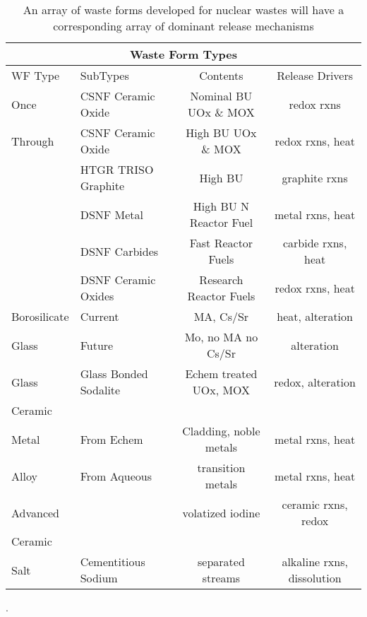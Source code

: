 %
\begin{table}[h!]
  \centering
  \footnotesize{
  \begin{tabular}{|l|l|c|c|}
    \multicolumn{4}{c}{\textbf{Waste Form Types}}\\
    \hline
    WF Type & SubTypes & Contents & Release Drivers  \\
    \hline
    \hline
    Once         & CSNF Ceramic Oxide & Nominal BU UOx \& MOX & redox rxns \\
     Through     & CSNF Ceramic Oxide & High BU UOx \& MOX & redox rxns, heat  \\
                 & HTGR TRISO Graphite & High BU & graphite rxns\\
                 & DSNF Metal  & High BU N Reactor Fuel & metal rxns,  heat\\
                 & DSNF Carbides  & Fast Reactor Fuels & carbide rxns,  heat\\
                 & DSNF Ceramic Oxides  & Research Reactor Fuels & redox rxns,  heat\\
    \hline
    Borosilicate & Current & MA, Cs/Sr & heat, alteration \\
     Glass       & Future & Mo, no MA no Cs/Sr & alteration  \\
    \hline
    Glass & Glass Bonded Sodalite & Echem treated UOx, MOX & redox, alteration\\
    Ceramic  &&&\\
    \hline
    Metal & From Echem & Cladding, noble metals & metal rxns, heat \\
    Alloy       & From Aqueous & transition metals & metal rxns, heat  \\
    \hline
    Advanced &  & volatized iodine  & ceramic rxns, redox \\
    Ceramic &&&\\
    \hline
    Salt  & Cementitious Sodium  & separated streams  & alkaline rxns, dissolution \\
    \hline
  \end{tabular}
  \caption[Waste Form Types]{An array of waste forms developed for nuclear 
  wastes will have a corresponding array of dominant release mechanisms \cite{blink_disposal_2010}}.
  \label{tab:wf}
  }
\end{table}


